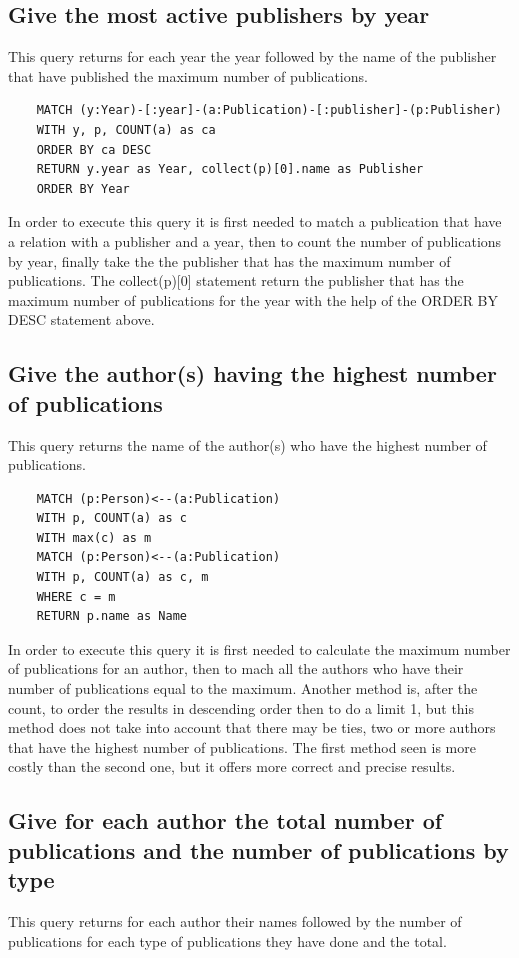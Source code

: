 \documentclass{article}
\begin{document}
\subsection{Give the most active publishers by year} \label{3.5}
This query returns for each year the year followed by the name of the publisher that have published the maximum number of publications.

\begin{lstlisting}
    MATCH (y:Year)-[:year]-(a:Publication)-[:publisher]-(p:Publisher)
    WITH y, p, COUNT(a) as ca 
    ORDER BY ca DESC
    RETURN y.year as Year, collect(p)[0].name as Publisher 
    ORDER BY Year
\end{lstlisting}

In order to execute this query it is first needed to match a publication that have a relation with a publisher and a year, then to count the number of publications by year, finally take the the publisher that has the maximum number of publications. The collect(p)[0] statement return the publisher that has the maximum number of publications for the year with the help of the ORDER BY DESC statement above. 

\subsection{Give the author(s) having the highest number of publications}
This query returns the name of the author(s) who have the highest number of publications.

\begin{lstlisting}
    MATCH (p:Person)<--(a:Publication)
    WITH p, COUNT(a) as c
    WITH max(c) as m
    MATCH (p:Person)<--(a:Publication)
    WITH p, COUNT(a) as c, m
    WHERE c = m
    RETURN p.name as Name
\end{lstlisting}

In order to execute this query it is first needed to calculate the maximum number of publications for an author, then to mach all the authors who have their number of publications equal to the maximum. Another method is, after the count, to order the results in descending order then to do a limit 1, but this method does not take into account that there may be ties, two or more authors that have the highest number of publications. The first method seen is more costly than the second one, but it offers more correct and precise results.


\subsection{Give for each author the total number of publications and the number of publications by type}
This query returns for each author their names followed by the number of publications for each type of publications they have done and the total.
\end{document}
